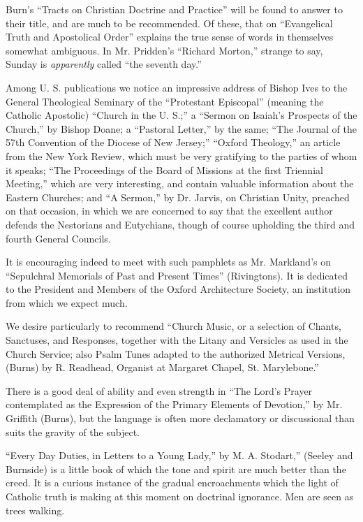 Burn's ``Tracts on Christian Doctrine and Practice''
will be found to answer to their title, and are much to be recommended.
Of these, that on ``Evangelical Truth and Apostolical Order'' explains the
true sense of words in themselves somewhat ambiguous. In Mr.
Pridden's ``Richard Morton,'' strange to say, Sunday is \emph{apparently}
called ``the seventh day.''

Among U. S. publications we notice an impressive
address of Bishop Ives to the General Theological Seminary of the ``Protestant
Episcopal'' (meaning the Catholic Apostolic) ``Church in the U. S.;'' a ``Sermon
on Isaiah's Prospects of the Church,'' by Bishop Doane; a ``Pastoral
Letter,'' by the same; ``The Journal of the 57th Convention of the Diocese
of New Jersey;'' ``Oxford Theology,'' an article from the New York Review,
which must be very gratifying to the parties of whom it speaks; ``The
Proceedings of the Board of Missions at the first Triennial Meeting,''
which are very interesting, and contain valuable information about the
Eastern Churches; and ``A Sermon,'' by Dr. Jarvis, on Christian Unity,
preached on that occasion, in which we are concerned to say that the
excellent author defends the Nestorians and Eutychians, though of course
upholding the third and fourth General Councils.

It is encouraging indeed to meet with such
pamphlets as Mr. Markland's on ``Sepulchral Memorials of Past and Present
Times'' (Rivingtons). It is dedicated to the President and Members of the
Oxford Architecture Society, an institution from which we expect much.

We desire particularly to recommend ``Church Music,
or a selection of Chants, Sanctuses, and Responses, together with the
Litany and Versicles as used in the Church Service; also Psalm Tunes
adapted to the authorized Metrical Versions, (Burns) by R. Readhead,
Organist at Margaret Chapel, St. Marylebone.''

There is a good deal of ability and even strength
in ``The Lord's Prayer contemplated as the Expression of the Primary
Elements of Devotion,'' by Mr. Griffith (Burns), but the language is
often more declamatory or discussional than suits the gravity of the
subject.

``Every Day Duties, in Letters to a Young Lady,'' by
M. A. Stodart,'' (Seeley and Burnside) is a little book of which the tone
and spirit are much better than the creed. It is a curious instance of
the gradual encroachments which the light of Catholic truth is making at
this moment on doctrinal ignorance. Men are seen as trees walking.

